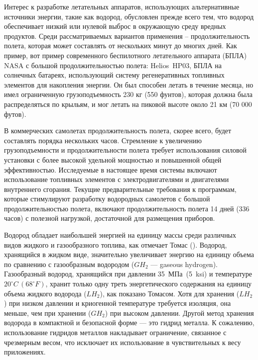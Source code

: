 Интерес к разработке летательных аппаратов, использующих альтернативные источники энергии, такие как водород, обусловлен прежде всего тем, что водород обеспечивает низкий или нулевой выброс в окружающую среду вредных продуктов. Среди рассматриваемых вариантов применения -- продолжительность полета, которая может составлять от нескольких минут до многих дней. Как пример, вот пример современного беспилотного летательного аппарата (БПЛА)  NASA с большой продолжительностью полета: Helios~HP03, БПЛА на солнечных батареях, использующий систему регенеративных топливных элементов для накопления энергии. Он был способен летать в течение месяца, но имел ограниченную грузоподъемность 230 кг (550 фунтов), которая должна была распределяться по крыльям, и мог летать на пиковой высоте около 21 км (70 000 футов).

В коммерческих самолетах продолжительность полета, скорее всего, будет составлять порядка нескольких часов. Стремление к увеличению грузоподъемности и продолжительности полета требует использования силовой установки с более высокой удельной мощностью и повышенной общей эффективностью. Исследуемые в настоящее время системы включают использование топливных элементов с электродвигателями и двигателями внутреннего сгорания. Текущие предварительные требования к программам, которые стимулируют разработку водородных самолетов с большой продолжительностью полета, включают продолжительность полета 14 дней (336 часов) с полезной нагрузкой, достаточной для размещения приборов.

Водород обладает наибольшей энергией на единицу массы среди различных видов жидкого и газообразного топлива, как отмечает Томас (\cite{thomas}). Водород, хранящийся в жидком виде, значительно увеличивает энергию на единицу объема по сравнению с газообразным водородом (\(GH_2\) --- gaseous hydrogen). Газообразный водород, хранящийся при давлении 35~МПа~(5~ksi) и температуре \(20^{\circ} C \,(68^{\circ} F)\), хранит только одну треть энергетического содержания на единицу объема жидкого водорода (\(LH_2\)), как показано Томасом. Хотя для хранения (\(LH_2\)) при низком давлении и криогенной температуре требуется изоляция, она меньше, чем при хранении  (\(GH_2\)) при высоком давлении. Другой метод хранения водорода в компактной и безопасной форме --- это гидрид металла. К сожалению, использование гидридов металлов накладывает ограничение, связанное с чрезмерным весом, что исключает их использование в чувствительных к весу приложениях. 

